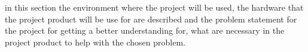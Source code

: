 in this section the environment where the project will be used, the hardware that the project product will be use for are described and the problem statement for the project for getting a better understanding for, what are necessary in the project product to help with the chosen problem.